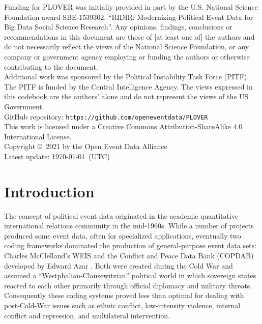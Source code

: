 \documentclass[11pt]{report}
\newcommand{\txt}[1]{\texttt{#1}}
\begin{document}
\noindent Funding for PLOVER was initially provided in part by the U.S. National Science Foundation award SBE-1539302, ``RIDIR: Modernizing Political Event Data for Big Data Social Science Research''. Any opinions, findings, conclusions or recommendations in this document are those of [at least one of] the authors and do not necessarily reflect the views of the National Science Foundation, or any company or government agency employing or funding the authors or otherwise contributing to the document.\\

\noindent Additional work was sponsored by the Political Instability Task Force (PITF). The PITF is funded by the Central Intelligence Agency. The views expressed in this codebook are the authors' alone and do not
represent the views of the US Government.\\

\noindent GitHub repository: \txt{https://github.com/openeventdata/PLOVER}\\


\noindent This work is licensed under a Creative Commons Attribution-ShareAlike 4.0 International License.\\

\noindent  Copyright \copyright ~2021 by the Open Event Data Alliance \\

\noindent Latest update: \today~(UTC)


\chapter{Introduction}

The concept of political event data originated in the academic quantitative international relations community in the mid-1960s. While a number of projects produced some event data, often for specialized applications, eventually two coding frameworks dominated the production of general-purpose event data sets: Charles McClelland's WEIS \citep{McClelland67,McClelland76}  and the Conflict and Peace Data Bank (COPDAB) developed by Edward Azar \citep{AzarSloan75, Azar80, Azar82}. Both were created during the Cold War and assumed a ``Westphalian-Clausewitzian'' political world in which sovereign states reacted to each other primarily through official diplomacy
and military threats. Consequently these coding systems proved less than optimal for dealing with post-Cold-War issues such as ethnic conflict, low-intensity violence, internal conflict and repression, and multilateral intervention.
\end{document}
